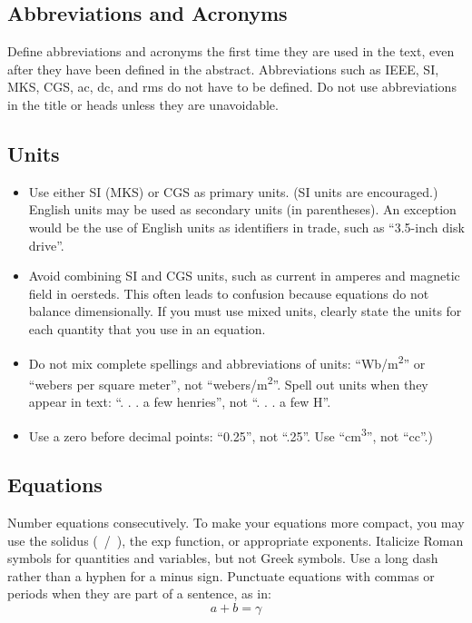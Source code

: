 \documentclass[conference,a4paper]{IEEEtran}
\begin{document}
\subsection{Abbreviations and Acronyms}\label{AA}
Define abbreviations and acronyms the first time they are used in the text, 
even after they have been defined in the abstract. Abbreviations such as 
IEEE, SI, MKS, CGS, ac, dc, and rms do not have to be defined. Do not use 
abbreviations in the title or heads unless they are unavoidable.

\subsection{Units}
\begin{itemize}
\item Use either SI (MKS) or CGS as primary units. (SI units are encouraged.) English units may be used as secondary units (in parentheses). An exception would be the use of English units as identifiers in trade, such as ``3.5-inch disk drive''.
\item Avoid combining SI and CGS units, such as current in amperes and magnetic field in oersteds. This often leads to confusion because equations do not balance dimensionally. If you must use mixed units, clearly state the units for each quantity that you use in an equation.
\item Do not mix complete spellings and abbreviations of units: ``Wb/m\textsuperscript{2}'' or ``webers per square meter'', not ``webers/m\textsuperscript{2}''. Spell out units when they appear in text: ``. . . a few henries'', not ``. . . a few H''.
\item Use a zero before decimal points: ``0.25'', not ``.25''. Use ``cm\textsuperscript{3}'', not ``cc''.)
\end{itemize}

\subsection{Equations}
Number equations consecutively. To make your 
equations more compact, you may use the solidus (~/~), the exp function, or 
appropriate exponents. Italicize Roman symbols for quantities and variables, 
but not Greek symbols. Use a long dash rather than a hyphen for a minus 
sign. Punctuate equations with commas or periods when they are part of a 
sentence, as in:
\begin{equation}
a+b=\gamma\label{eq}
\end{equation}
\end{document}
